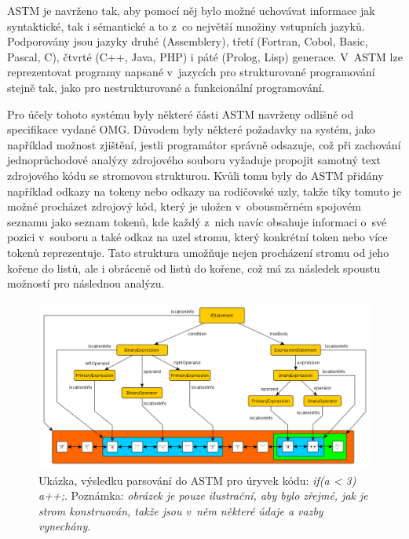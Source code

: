 \documentclass[11pt,twoside,a4paper]{book}
\begin{document}
ASTM je navrženo tak, aby pomocí něj bylo možné uchovávat informace jak syntaktické, tak i sémantické a to z~co největší množiny
vstupních jazyků. Podporovány jsou jazyky druhé (Assemblery), třetí (Fortran, Cobol, Basic, Pascal, C), čtvrté (C++, Java, PHP)
i páté (Prolog, Lisp) generace. V~ASTM lze reprezentovat programy napsané v~jazycích pro strukturované programování stejně tak, jako pro
nestrukturované a funkcionální programování.


Pro účely tohoto systému byly některé části ASTM navrženy odlišně od specifikace vydané OMG. Důvodem byly některé požadavky na systém,
jako například možnost zjištění, jestli programátor správně odsazuje, což při zachování jednoprůchodové analýzy zdrojového souboru vyžaduje
propojit samotný text zdrojového kódu se stromovou strukturou. Kvůli tomu byly do ASTM přidány například odkazy na tokeny
nebo odkazy na rodičovské uzly, takže tíky tomuto je možné procházet zdrojový kód, který je uložen v~obousměrném spojovém seznamu jako seznam tokenů,
kde každý z~nich navíc obsahuje informaci o~své pozici v~souboru a také odkaz na uzel stromu, který konkrétní token nebo více tokenů reprezentuje.
Tato struktura umožňuje nejen procházení stromu od jeho kořene do listů, ale i obráceně od listů do kořene, což má za následek spoustu možností
pro následnou analýzu.

\begin{figure}[H]
\begin{center}
\includegraphics[width=15cm]{figures/parsing_example.pdf}
\caption{Ukázka, výsledku parsování do ASTM pro úryvek kódu: \textit{if(a < 3) a++;}. \mbox{Poznámka:} \textit{obrázek je pouze ilustrační,
aby bylo zřejmé, jak je strom konstruován, takže jsou v~něm některé údaje a vazby vynechány}.}
\label{fig:parsing_example}
\end{center}
\end{figure}
\end{document}
